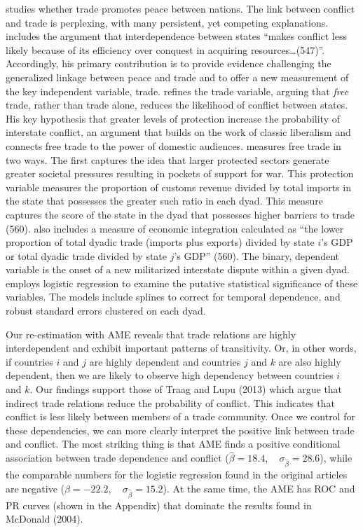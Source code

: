 \citet{mcdonald:2004} studies whether trade promotes peace between nations. The link between conflict and trade is perplexing, with many persistent, yet competing explanations. \citet{mcdonald:2004} includes the argument that interdependence between states ``makes conflict less likely because of its efficiency over conquest in acquiring resources\ldots (547)''. Accordingly, his primary contribution is to provide evidence challenging the generalized linkage between peace and trade and to offer a new measurement of the key independent variable, trade. \citet{mcdonald:2004} refines the trade variable, arguing that \textit{free} trade, rather than trade alone, reduces the likelihood of conflict between states. His key hypothesis that greater levels of protection increase the probability of interstate conflict, an argument that builds on the work of classic liberalism and connects free trade to the power of domestic audiences. \citet{mcdonald:2004} measures free trade in two ways. The first captures the idea that larger protected sectors generate greater societal pressures resulting in pockets of support for war. This protection variable measures the proportion of customs revenue divided by total imports in the state that possesses the greater such ratio in each dyad. This measure captures the score of the state in the dyad that possesses higher barriers to trade (560). \citet{mcdonald:2004} also includes a measure of economic integration  calculated as ``the lower proportion of total dyadic trade (imports plus exports) divided by state $i$'s GDP or total dyadic trade divided by state $j$'s GDP'' (560). The binary, dependent variable is the onset of a new militarized interstate dispute within a given dyad. \citet{mcdonald:2004} employs logistic regression to examine the putative statistical significance of these variables. The models include splines to correct for temporal dependence, and robust standard errors clustered on each dyad.

Our re-estimation with AME reveals that trade relations are highly interdependent and exhibit important patterns of transitivity.  Or, in other words, if countries $i$ and $j$ are highly dependent and countries $j$ and $k$ are also highly dependent, then we are likely to observe high dependency between countries $i$ and $k$. Our findings support those of Traag and Lupu (2013) which argue that indirect trade relations reduce the probability of conflict. This indicates that conflict is less likely between members of a trade community. Once we control for these dependencies, we can more clearly interpret the positive link between trade and conflict.  The most striking thing is that AME finds a positive conditional association between trade dependence and conflict ($\hat{\beta}= 18.4, \quad \sigma_{\hat{\beta}} = 28.6$), while the comparable numbers for the logistic regression found in the original articles are negative ($\hat{\beta}= -22.2, \quad \sigma_{\hat{\beta}} = 15.2$). At the same time, the AME has ROC and PR curves (shown in the Appendix) that dominate the results found in McDonald (2004).

